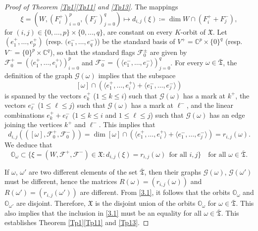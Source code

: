 \documentclass[ALCO,Unicode]{cedram}
\newcommand{\Span}[1]{\langle #1\rangle}
\newcommand{\flag}{\mathcal{F}}
\newcommand{\Xorbit}{\mathbb{O}}
\newcommand{\ppermutationsof}{\mathfrak{T}}
\newcommand{\parameters}{\overline{\ppermutationsof}}
\newcommand{\Xfv}{\mathfrak{X}}
\newcommand{\mC}{\mathbb{C}}
\begin{document}
\begin{proof}[Proof of Theorem \ref{Tp1}\ref{Tp11} and \ref{Tp13}]
The mappings
\[\xi=(W,(F^+_i)_{i=0}^p,(F^-_j)_{j=0}^q)\mapsto d_{i,j}(\xi)\coloneqq \dim W\cap (F_i^++F_j^-),\] for $(i,j)\in\{0,\ldots,p\}\times\{0,\ldots,q\}$, are constant on every $K$-orbit of $\Xfv$.
Let $(e_1^+,\ldots,e_p^+)$ (resp. $(e_1^-,\ldots,e_q^-$)) be the standard basis of $V^+=\mC^p\times\{0\}^q$ (resp. $V^-=\{0\}^p\times\mC^q$), so that the standard flags $\flag_0^\pm$ are given by $\flag_0^+=(\Span{e_1^+,\ldots,e_i^+})_{i=0}^p$ and $\flag_0^-=(\Span{e_1^-,\ldots,e_j^-})_{j=0}^q$.
For every $\omega\in\parameters$,
the definition of the graph $\mathcal{G}(\omega)$ implies that the subspace \[[\omega]\cap(\Span{e_1^+,\ldots,e_i^+}+\Span{e_1^-,\ldots,e_j^-})\]
is spanned by the vectors $e_k^+$ ($1\leq k\leq i$) such that $\mathcal{G}(\omega)$ has a mark at $k^+$, the vectors $e_\ell^-$ ($1\leq \ell\leq j$) such that $\mathcal{G}(\omega)$ has a mark at $\ell^-$, and the linear combinations $e_k^++e_\ell^-$ ($1\leq k\leq i$ and $1\leq \ell\leq j$) such that $\mathcal{G}(\omega)$ has an edge joining the vertices $k^+$ and $\ell^-$. This implies that
\[
d_{i,j}(([\omega],\flag_0^+,\flag_0^-))=\dim [\omega]\cap(\Span{e_1^+,\ldots,e_i^+}+\Span{e_1^-,\ldots,e_j^-})=r_{i,j}(\omega).
\]
We deduce that
\begin{equation}
\label{3.1}
\Xorbit_\omega\subset \{\xi=(W,\flag^+,\flag^-)\in\Xfv: d_{i,j}(\xi)=r_{i,j}(\omega)\ \ \mbox{for all $i,j$}\}\quad\mbox{for all $\omega\in\parameters$}.
\end{equation}

If $\omega$, $\omega'$ are two different elements of the set $\parameters$, then their graphs $\mathcal{G}(\omega)$, $\mathcal{G}(\omega')$ must be different, hence the matrices $R(\omega)=(r_{i,j}(\omega))$ and $R(\omega')=(r_{i,j}(\omega'))$ are different. From \eqref{3.1}, it follows that the orbits $\Xorbit_\omega$ and $\Xorbit_{\omega'}$ are disjoint.
Therefore, $\Xfv$ is the disjoint union of the orbits $\Xorbit_\omega$ for $\omega\in\parameters$. This also implies that the inclusion in \eqref{3.1} must be an equality for all $\omega\in\parameters$.
This establishes Theorem \ref{Tp1}\ref{Tp11} and \ref{Tp13}.
\end{proof}
\end{document}

